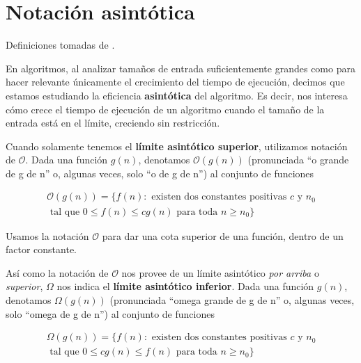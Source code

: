 \section{Notaci\'on asint\'otica}

Definiciones tomadas de \cite{cormenetal}.

En algoritmos, al analizar tamaños de entrada suficientemente grandes como para hacer relevante \'unicamente el crecimiento del tiempo de ejecuci\'on, decimos que estamos estudiando la eficiencia \textbf{asint\'otica} del algoritmo. Es decir, nos interesa c\'omo crece el tiempo de ejecuci\'on de un algoritmo cuando el tamaño de la entrada est\'a en el l\'imite, creciendo sin restricci\'on.

\begin{definition}
Cuando solamente tenemos el \textbf{l\'imite asint\'otico superior}, utilizamos notaci\'on de $\mathcal{O}$. Dada una funci\'on $g(n)$, denotamos $\mathcal{O}(g(n))$ (pronunciada ``o grande de g de n'' o, algunas veces, solo ``o de g de n'') al conjunto de funciones

\begin{equation*}
\begin{split}
\mathcal{O}(g(n)) = \{f(n): \text{ existen dos constantes positivas } c \text{ y } n_0 \\
\text{ tal que } 0 \leq f(n) \leq cg(n) \text{ para toda } n \geq n_0\}
\end{split}
\end{equation*}
\end{definition}

Usamos la notaci\'on $\mathcal{O}$ para dar una cota superior de una funci\'on, dentro de un factor constante.

\begin{definition}

As\'i como la notaci\'on de $\mathcal{O}$ nos provee de un l\'imite asint\'otico \textit{por arriba} o \textit{superior}, $\Omega$ nos indica el \textbf{l\'imite asint\'otico inferior}. Dada una funci\'on $g(n)$, denotamos $\Omega(g(n))$ (pronunciada ``omega grande de g de n'' o, algunas veces, solo ``omega de g de n'') al conjunto de funciones

\begin{equation*}
\begin{split}
\Omega(g(n)) = \{f(n): \text{ existen dos constantes positivas } c \text{ y } n_0 \\ \text{ tal que } 0 \leq cg(n) \leq f(n) \text{ para toda } n \geq n_0\}
\end{split}
\end{equation*}
\end{definition}

